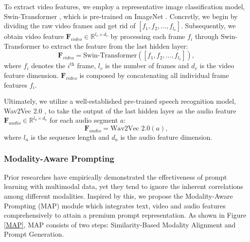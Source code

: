 \documentclass[letterpaper]{article} %
\begin{document}
To extract video features, we employ a representative image classification model, Swin-Transformer \cite{Liu_2021_ICCV}, which is pre-trained on ImageNet \cite{5206848}. Concretly, we begin by dividing the raw video frames and get rid of   $[f_{1}, f_{2}, \dots, f_{l_{v}}]$. Subsequently, we obtain video feature $\textbf{F}_{video} \in \mathbb{R}^{l_{v} \times d_{v}}$ by processing each frame $f_{i}$ through Swin-Transformer to extract the feature from the last hidden layer:
\begin{equation}
    \textbf{F}_{video} = \text{Swin-Transformer}([f_{1}, f_{2}, \dots, f_{l_{v}}]),
\end{equation}
where $f_{i}$ denotes the $i^{\text{th}}$ frame, $l_{v}$ is the number of frames and $d_{v}$ is the video feature dimension. $\textbf{F}_{video}$ is composed by concatenating all individual frame features $f_{i}$.

Ultimately, we utilize a well-established pre-trained speech recognition model, Wav2Vec 2.0 \cite{NEURIPS2020_92d1e1eb}, to take the output of the last hidden layer as the audio feature $\textbf{F}_{audio} \in \mathbb{R}^{l_{a} \times d_{a}}$ for each audio segment $a$:
\begin{equation}
    \textbf{F}_{audio} = \text{Wav2Vec 2.0}(a),
\end{equation}
where $l_{a}$ is the sequence length and $d_{a}$ is the audio feature dimension.


\subsubsection{Modality-Aware Prompting}

Prior researches \cite{zhou2022learning,zhou2022conditional,rao2022denseclip} have empirically demonstrated the effectiveness of prompt learning with multimodal data, yet they tend to ignore the inherent correlations among different modalities. Inspired by this, we propose the Modality-Aware Prompting (MAP) module which integrates text, video and audio features comprehensively to attain a premium prompt representation. As shown in Figure \ref{MAP}, MAP consists of two steps: Similarity-Based Modality Alignment and Prompt Generation.
\end{document}
